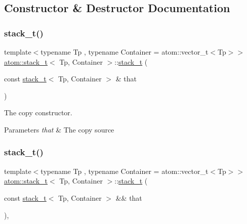 \subsection{Constructor \& Destructor Documentation}
\mbox{\label{classatom_1_1stack__t_a519cc745d74f25e1e73168d63bd7ce4a}} 
\subsubsection{\texorpdfstring{stack\+\_\+t()}{stack\_t()}\hspace{0.1cm}{\footnotesize\ttfamily [1/2]}}
{\footnotesize\ttfamily template$<$typename Tp , typename Container  = atom\+::vector\+\_\+t$<$\+Tp$>$$>$ \\
\hyperlink{classatom_1_1stack__t}{atom\+::stack\+\_\+t}$<$ Tp, Container $>$\+::\hyperlink{classatom_1_1stack__t}{stack\+\_\+t} (\begin{DoxyParamCaption}\item[{const \hyperlink{classatom_1_1stack__t}{stack\+\_\+t}$<$ Tp, Container $>$ \&}]{that }\end{DoxyParamCaption})\hspace{0.3cm}{\ttfamily [inline]}}



The copy constructor. 


\begin{DoxyParams}{Parameters}
{\em that} & The copy source \\
\hline
\end{DoxyParams}
\mbox{\label{classatom_1_1stack__t_a2423a055415e15266b1625ad78b38baf}} 
\subsubsection{\texorpdfstring{stack\+\_\+t()}{stack\_t()}\hspace{0.1cm}{\footnotesize\ttfamily [2/2]}}
{\footnotesize\ttfamily template$<$typename Tp , typename Container  = atom\+::vector\+\_\+t$<$\+Tp$>$$>$ \\
\hyperlink{classatom_1_1stack__t}{atom\+::stack\+\_\+t}$<$ Tp, Container $>$\+::\hyperlink{classatom_1_1stack__t}{stack\+\_\+t} (\begin{DoxyParamCaption}\item[{const \hyperlink{classatom_1_1stack__t}{stack\+\_\+t}$<$ Tp, Container $>$ \&\&}]{that }\end{DoxyParamCaption})\hspace{0.3cm}{\ttfamily [inline]}, {\ttfamily [noexcept]}}



